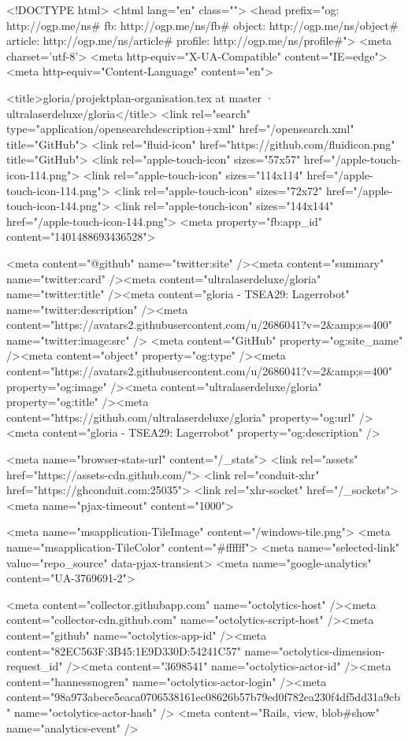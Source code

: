 



<!DOCTYPE html>
<html lang="en" class="">
  <head prefix="og: http://ogp.me/ns# fb: http://ogp.me/ns/fb# object: http://ogp.me/ns/object# article: http://ogp.me/ns/article# profile: http://ogp.me/ns/profile#">
    <meta charset='utf-8'>
    <meta http-equiv="X-UA-Compatible" content="IE=edge">
    <meta http-equiv="Content-Language" content="en">
    
    
    <title>gloria/projektplan-organisation.tex at master · ultralaserdeluxe/gloria</title>
    <link rel="search" type="application/opensearchdescription+xml" href="/opensearch.xml" title="GitHub">
    <link rel="fluid-icon" href="https://github.com/fluidicon.png" title="GitHub">
    <link rel="apple-touch-icon" sizes="57x57" href="/apple-touch-icon-114.png">
    <link rel="apple-touch-icon" sizes="114x114" href="/apple-touch-icon-114.png">
    <link rel="apple-touch-icon" sizes="72x72" href="/apple-touch-icon-144.png">
    <link rel="apple-touch-icon" sizes="144x144" href="/apple-touch-icon-144.png">
    <meta property="fb:app_id" content="1401488693436528">

      <meta content="@github" name="twitter:site" /><meta content="summary" name="twitter:card" /><meta content="ultralaserdeluxe/gloria" name="twitter:title" /><meta content="gloria - TSEA29: Lagerrobot" name="twitter:description" /><meta content="https://avatars2.githubusercontent.com/u/2686041?v=2&amp;s=400" name="twitter:image:src" />
<meta content="GitHub" property="og:site_name" /><meta content="object" property="og:type" /><meta content="https://avatars2.githubusercontent.com/u/2686041?v=2&amp;s=400" property="og:image" /><meta content="ultralaserdeluxe/gloria" property="og:title" /><meta content="https://github.com/ultralaserdeluxe/gloria" property="og:url" /><meta content="gloria - TSEA29: Lagerrobot" property="og:description" />

      <meta name="browser-stats-url" content="/_stats">
    <link rel="assets" href="https://assets-cdn.github.com/">
    <link rel="conduit-xhr" href="https://ghconduit.com:25035">
    <link rel="xhr-socket" href="/_sockets">
    <meta name="pjax-timeout" content="1000">

    <meta name="msapplication-TileImage" content="/windows-tile.png">
    <meta name="msapplication-TileColor" content="#ffffff">
    <meta name="selected-link" value="repo_source" data-pjax-transient>
      <meta name="google-analytics" content="UA-3769691-2">

    <meta content="collector.githubapp.com" name="octolytics-host" /><meta content="collector-cdn.github.com" name="octolytics-script-host" /><meta content="github" name="octolytics-app-id" /><meta content="82EC563F:3B45:1E9D330D:54241C57" name="octolytics-dimension-request_id" /><meta content="3698541" name="octolytics-actor-id" /><meta content="hannessnogren" name="octolytics-actor-login" /><meta content="98a973abece5eaca0706538161ec08626b57b79ed0f782ea230f4df5dd31a9cb" name="octolytics-actor-hash" />
    <meta content="Rails, view, blob#show" name="analytics-event" />

